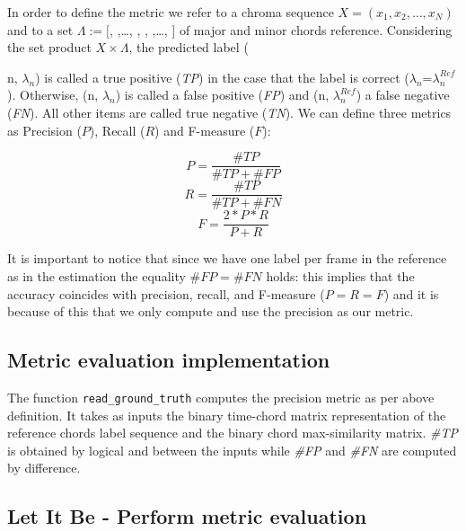 \documentclass[
	12pt, %
]{fphw}
\begin{document}
In order to define the metric we refer to a chroma sequence $X=(x_1,x_2,…,x_N)$ and to a set $\Lambda :=[$, ,…, , , ,…, $]$ of major and minor chords reference. Considering the set product $X \times \Lambda$, the predicted label ({n, $\lambda_n$) is called a true positive (\emph{TP}) in the case that the label is correct ($\lambda_n$=$\lambda_n^{Ref}$). Otherwise, (n, $\lambda_n$) is called a false positive (\emph{FP}) and (n, $\lambda_n^{Ref}$) a false negative (\emph{FN}). All other items are called true negative (\emph{TN}). We can define three metrics as Precision ($P$), Recall ($R$) and F-measure ($F$):

\begin{equation}
	P = \frac{\#TP}{\#TP+\#FP}
\end{equation}
\vspace{7pt}
\begin{equation}
	R = \frac{\#TP}{\#TP+\#FN}
\end{equation}
\vspace{7pt}
\begin{equation}
	F = \frac{2*P*R}{P+R}
\end{equation}
\vspace{7pt}

It is important to notice that since we have one label per frame in the reference as in the estimation the equality $\#FP=\#FN$ holds: this implies that the accuracy coincides with precision, recall, and F-measure ($P=R=F$) and it is because of this that we only compute and use the precision as our metric.

\subsection*{Metric evaluation implementation}

The function \verb|read_ground_truth| computes the precision metric as per above definition. It takes as inputs the binary time-chord matrix representation of the reference chords label sequence and the binary chord max-similarity matrix. \emph{\#TP} is obtained by logical and between the inputs while \emph{\#FP} and \emph{\#FN} are computed by difference.

\subsection*{Let It Be - Perform metric evaluation}

}
\end{document}
